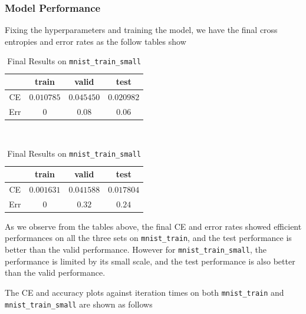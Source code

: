 \documentclass[10pt]{article}
\begin{document}
\subsubsection{Model Performance}
Fixing the hyperparameters and training the model, we have the final cross entropies and error rates as the follow tables show
\begin{table}[H]
\begin{minipage}{.5\linewidth}
\centering
\begin{tabular}{|c|c|c|c|}
\hline
 & train & valid & test\\
\hline
CE & $0.010785$ & $0.045450$ & $0.020982$ \\
\hline
Err & $0$ & $0.08$ & $0.06$ \\
\hline
\end{tabular}
\caption{Final Results on \texttt{mnist\_train}}
\end{minipage}
\ 
\begin{minipage}{.5\linewidth}
\centering
\begin{tabular}{|c|c|c|c|}
\hline
 & train & valid & test\\
\hline
CE & $0.001631$ & $0.041588$ & $0.017804$ \\
\hline
Err & $0$ & $0.32$ & $0.24$ \\
\hline
\end{tabular}
\caption{Final Results on \texttt{mnist\_train\_small}}
\end{minipage}
\end{table}
As we observe from the tables above, the final CE and error rates showed efficient performances on all the three sets on \texttt{mnist\_train}, and the test performance is better than the valid performance. However for \texttt{mnist\_train\_small}, the performance is limited by its small scale, and the test performance is also better than the valid performance.\par
The CE and accuracy plots against iteration times on both \texttt{mnist\_train} and \texttt{mnist\_train\_small} are shown as follows
\end{document}
